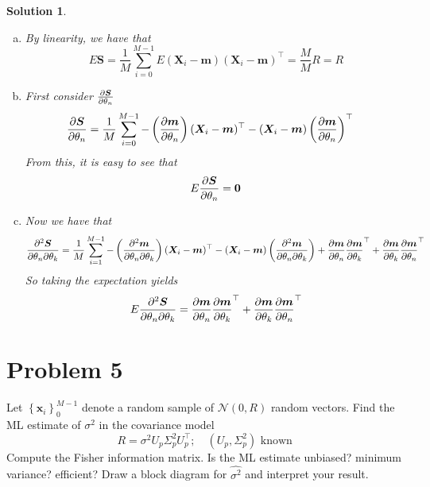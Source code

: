\documentclass[a4paper]{article}
\newtheorem*{sol}{Solution}
\begin{document}
\begin{sol}
  \begin{enumerate}[a.]
   \item By linearity, we have that
     \[
       E \bm{S} = \frac{1}{M} \sum_{i=0}^{M-1} E (\bm{X}_i - \bm{m})(\bm{X}_i -\bm{m})^\top = \frac{M}{M} R = R
     \]
   \item First consider $\pdv{\bm{S}}{\theta_n}$
     \[
       \begin{aligned}
         \pdv{\bm{S}}{\theta_n} &=  \frac{1}{M} \sum_{i=0}^{M-1}  - \left(\pdv{\bm{m}}{\theta_n} \right)(\bm{X}_i - \bm{m})^\top - (\bm{X}_i - \bm{m})\left( \pdv{\bm{m}}{\theta_n} \right)^\top
       \end{aligned}
     \]
     From this, it is easy to see that 
     \[
       E  \pdv{\bm{S}}{\theta_n} = \bm{0}
     \]
   \item Now we have that 
     \[
       \pdv{\bm{S}}{\theta_n}{\theta_k} = \frac{1}{M} \sum_{i=1}^{M-1}  -\left( \pdv{\bm{m}}{\theta_n}{\theta_k} \right)(\bm{X}_i - \bm{m})^\top - (\bm{X}_i - \bm{m}) \left( \pdv{\bm{m}}{\theta_n}{\theta_k} \right) + \pdv{\bm{m}}{\theta_n} \pdv{\bm{m}}{\theta_k}^\top + \pdv{\bm{m}}{\theta_k}\pdv{\bm{m}}{\theta_n}^\top 
     \]
     So taking the expectation yields
     \[
       E\pdv{\bm{S}}{\theta_n}{\theta_k} = \pdv{\bm{m}}{\theta_n} \pdv{\bm{m}}{\theta_k}^\top + \pdv{\bm{m}}{\theta_k}\pdv{\bm{m}}{\theta_n}^\top 
     \]
 \end{enumerate} 
\end{sol}

\section*{Problem 5}%
Let $\left\{ \bm{x}_i \right\}_0^{M-1}$ denote a random sample of $\mathcal{N}(0,R)$ random vectors. Find the ML estimate of $\sigma^2$ in the covariance model
\[
  R = \sigma^2 U_p \Sigma^2_p U_p^\top; \quad (U_p, \Sigma_p^2) \text{ known }
\]
Compute the Fisher information matrix. Is the ML estimate unbiased? minimum variance? efficient? Draw a block diagram for $\hat{\sigma^2}$ and interpret your result.
\end{document}
